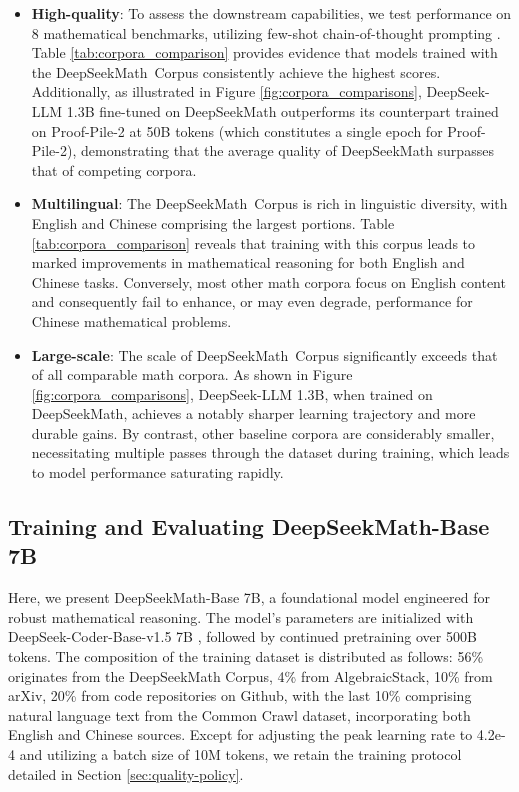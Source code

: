 \begin{itemize}[topsep=0pt]
    \item \textbf{High-quality}:
    To assess the downstream capabilities, we test performance on 8 mathematical benchmarks, utilizing few-shot chain-of-thought prompting \cite{cot}. Table \ref{tab:corpora_comparison} provides evidence that models trained with the DeepSeekMath~Corpus consistently achieve the highest scores. Additionally, as illustrated in Figure \ref{fig:corpora_comparisons}, DeepSeek-LLM 1.3B fine-tuned on DeepSeekMath outperforms its counterpart trained on Proof-Pile-2 at 50B tokens (which constitutes a single epoch for Proof-Pile-2), demonstrating that the average quality of DeepSeekMath surpasses that of competing corpora.
    \item \textbf{Multilingual}:
    The DeepSeekMath~Corpus is rich in linguistic diversity, with English and Chinese comprising the largest portions. Table \ref{tab:corpora_comparison} reveals that training with this corpus leads to marked improvements in mathematical reasoning for both English and Chinese tasks. Conversely, most other math corpora focus on English content and consequently fail to enhance, or may even degrade, performance for Chinese mathematical problems.
    \item \textbf{Large-scale}:
    The scale of DeepSeekMath~Corpus significantly exceeds that of all comparable math corpora. As shown in Figure \ref{fig:corpora_comparisons}, DeepSeek-LLM 1.3B, when trained on DeepSeekMath, achieves a notably sharper learning trajectory and more durable gains. By contrast, other baseline corpora are considerably smaller, necessitating multiple passes through the dataset during training, which leads to model performance saturating rapidly.
\end{itemize}

\subsection{Training and Evaluating DeepSeekMath-Base 7B}

Here, we present DeepSeekMath-Base 7B, a foundational model engineered for robust mathematical reasoning. The model’s parameters are initialized with DeepSeek-Coder-Base-v1.5 7B \citep{deepseek-coder}, followed by continued pretraining over 500B tokens. The composition of the training dataset is distributed as follows: 56\% originates from the DeepSeekMath Corpus, 4\% from AlgebraicStack, 10\% from arXiv, 20\% from code repositories on Github, with the last 10\% comprising natural language text from the Common Crawl dataset, incorporating both English and Chinese sources. Except for adjusting the peak learning rate to 4.2e-4 and utilizing a batch size of 10M tokens, we retain the training protocol detailed in Section \ref{sec:quality-policy}.

